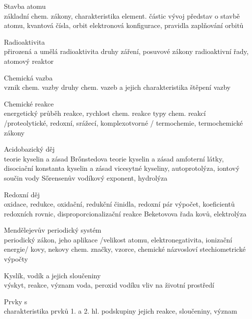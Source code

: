 \begin{boldEnum}
    \item Stavba atomu \\    
    základní chem. zákony, charakteristika element. částic vývoj představ o stavbě atomu, kvantová čísla,
    orbit elektronová konfigurace, pravidla zaplňování orbitů
    
    \item Radioaktivita \\
    přirozená a umělá radioaktivita druhy záření, posuvové zákony radioaktivní řady, atomový reaktor

    \item Chemická vazba \\    
    vznik chem. vazby druhy chem. vazeb a jejich charakteristika štěpení vazby

    \item Chemické reakce \\    
    energetický průběh reakce, rychlost chem. reakce typy chem. reakcí /proteolytické, redoxní, srážecí,
    komplexotvorné / termochemie, termochemické zákony

    \item Acidobazický děj \\
    teorie kyselin a zásad Brőnstedova teorie kyselin a zásad amfoterní látky, disociační konstanta kyselin
    a zásad vicesytné kyseliny, autoprotolýza, iontový součin vody Sőrensenův vodíkový exponent,
    hydrolýza

    \item Redoxní děj \\    
    oxidace, redukce, oxidační, redukční činidla, redoxní pár výpočet, koeficientů redoxních rovnic,
    disproporcionalizační reakce Beketovova řada kovů, elektrolýza

    \item Mendělejevův periodický systém \\    
    periodický zákon, jeho aplikace /velikost atomu, elektronegativita, ionizační energie/ kovy, nekovy
    chem. značky, vzorce, chemické názvosloví stechiometrické výpočty
    
    \item Kyslík, vodík a jejich sloučeniny \\    
    výskyt, reakce, význam voda, peroxid vodíku vliv na životní prostředí
    
    \item Prvky s \\    
    charakteristika prvků 1. a 2. hl. podskupiny jejich reakce, sloučeniny, význam
    

\end{boldEnum}
